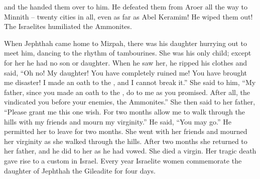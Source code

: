 {and the
{}
handed them over to him.
He defeated
them from Aroer
all the way to
Minnith
– twenty
cities
in all,
even as far
as Abel
Keramim! He wiped them out! The Israelites
humiliated
the Ammonites.
\par }{\PP {}When Jephthah
came
home
to Mizpah,
there was
his daughter
hurrying out
to meet
him, dancing
to the rhythm
of tambourines.
She was his only child;
except
for her he had no
son
or
daughter.
When
he saw
her,
he ripped
his clothes
and said,
“Oh
no! My daughter! You have completely ruined
me! You
have brought me disaster! I
made an oath
to
the {},
and I cannot
break it.”
She said
to him,
“My father,
since you made an oath
to
the {}, do
to me as
you promised.
After
all, the
{}
vindicated
you before your enemies,
the Ammonites.”
She then said
to
her father,
“Please grant
me this
one
wish.
For two
months
allow
me to walk
through
the hills
with my friends
and mourn
my virginity.”
He said,
“You may
go.”
He permitted
her to leave for two
months.
She went
with her friends
and mourned
her virginity
as she walked through the hills.
After
two
months
she returned
to
her father,
and he did
to her as he had
vowed.
She
died a virgin.
Her tragic death gave rise to a custom
in Israel.
Every year
Israelite
women commemorate
the daughter
of Jephthah
the Gileadite
for four
days.

}
